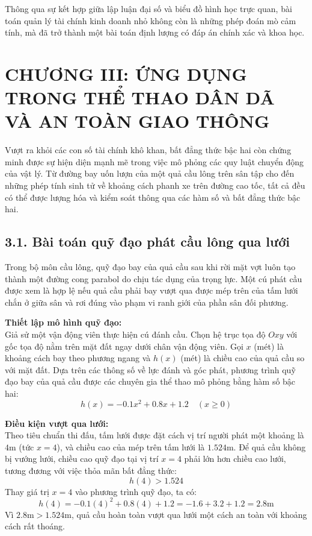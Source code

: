 \documentclass[14pt, a4paper, oneside]{extreport}
\begin{document}
Thông qua sự kết hợp giữa lập luận đại số và biểu đồ hình học trực quan, bài toán quản lý tài chính kinh doanh nhỏ không còn là những phép đoán mò cảm tính, mà đã trở thành một bài toán định lượng có đáp án chính xác và khoa học.

\clearpage

\section*{\centering CHƯƠNG III: ỨNG DỤNG TRONG THỂ THAO DÂN DÃ VÀ AN TOÀN GIAO THÔNG}

Vượt ra khỏi các con số tài chính khô khan, bất đẳng thức bậc hai còn chứng minh được sự hiện diện mạnh mẽ trong việc mô phỏng các quy luật chuyển động của vật lý. Từ đường bay uốn lượn của một quả cầu lông trên sân tập cho đến những phép tính sinh tử về khoảng cách phanh xe trên đường cao tốc, tất cả đều có thể được lượng hóa và kiểm soát thông qua các hàm số và bất đẳng thức bậc hai.

\subsection*{3.1. Bài toán quỹ đạo phát cầu lông qua lưới}

Trong bộ môn cầu lông, quỹ đạo bay của quả cầu sau khi rời mặt vợt luôn tạo thành một đường cong parabol do chịu tác dụng của trọng lực. Một cú phát cầu được xem là hợp lệ nếu quả cầu phải bay vượt qua được mép trên của tấm lưới chắn ở giữa sân và rơi đúng vào phạm vi ranh giới của phần sân đối phương.

\textbf{Thiết lập mô hình quỹ đạo:} \\
Giả sử một vận động viên thực hiện cú đánh cầu. Chọn hệ trục tọa độ $Oxy$ với gốc tọa độ nằm trên mặt đất ngay dưới chân vận động viên. Gọi $x$ (mét) là khoảng cách bay theo phương ngang và $h(x)$ (mét) là chiều cao của quả cầu so với mặt đất. Dựa trên các thông số về lực đánh và góc phát, phương trình quỹ đạo bay của quả cầu được các chuyên gia thể thao mô phỏng bằng hàm số bậc hai:
\[ h(x) = -0.1x^2 + 0.8x + 1.2 \quad (x \ge 0) \]

\textbf{Điều kiện vượt qua lưới:} \\
Theo tiêu chuẩn thi đấu, tấm lưới được đặt cách vị trí người phát một khoảng là $4\text{m}$ (tức $x = 4$), và chiều cao của mép trên tấm lưới là $1.524\text{m}$. Để quả cầu không bị vướng lưới, chiều cao quỹ đạo tại vị trí $x = 4$ phải lớn hơn chiều cao lưới, tương đương với việc thỏa mãn bất đẳng thức:
\[ h(4) > 1.524 \]
Thay giá trị $x = 4$ vào phương trình quỹ đạo, ta có:
\[ h(4) = -0.1(4)^2 + 0.8(4) + 1.2 = -1.6 + 3.2 + 1.2 = 2.8\text{m} \]
Vì $2.8\text{m} > 1.524\text{m}$, quả cầu hoàn toàn vượt qua lưới một cách an toàn với khoảng cách rất thoáng.
\end{document}

